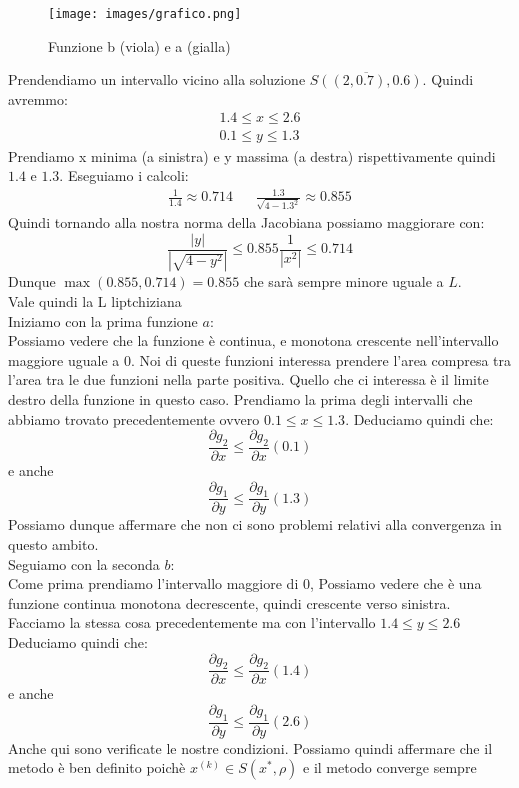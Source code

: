 \documentclass[11pt]{article}
\begin{document}
\begin{figure}[H]
  \centering
  \texttt{[image: images/grafico.png]}
  \caption{Funzione b (viola) e a (gialla)}
  \label{fig:funzione1}
\end{figure} 
Prendendiamo un intervallo vicino alla soluzione $\overline{S((2,0.7), 0.6)}$.
Quindi avremmo:
\[
\begin{matrix}
1.4\leq x\leq2.6\\
0.1 \leq y \leq 1.3	
\end{matrix}
\]
Prendiamo x minima (a sinistra) e y massima (a destra) rispettivamente quindi $1.4$ e $1.3$. Eseguiamo i calcoli:
\[
\begin{matrix}
	\frac{1}{1.4}\approx0.714&&
	\frac{1.3}{\sqrt{4-1.3^2}}\approx0.855
\end{matrix}
\]
Quindi tornando alla nostra norma della Jacobiana possiamo maggiorare con:
\[
 \frac{|y|}{|\sqrt{4-y^2}|}\leq0.855  \frac{1}{|x^2|}\leq0.714 
\]
Dunque $\max{(0.855,0.714)}=0.855$ che sarà sempre minore uguale a $L$.\\
Vale quindi la L liptchiziana\\
Iniziamo con la prima funzione $a$:\\
Possiamo vedere che la funzione è continua, e monotona crescente nell'intervallo maggiore uguale a 0. Noi di queste funzioni interessa prendere l'area compresa tra l'area  tra le due funzioni nella parte positiva. Quello che ci interessa è il limite destro della funzione in questo caso. Prendiamo la prima degli intervalli che abbiamo trovato precedentemente ovvero $0.1\leq x\leq 1.3$.
Deduciamo quindi che:\\
\[
	\frac{\partial g_2}{\partial x}\leq \frac{\partial g_2}{\partial x}(0.1)
\] e anche
\[
	\frac{\partial g_1}{\partial y}\leq \frac{\partial g_1}{\partial y}(1.3)
\]
Possiamo dunque affermare che non ci sono problemi relativi alla convergenza in questo ambito.
\\Seguiamo con la seconda $b$:\\
Come prima prendiamo l'intervallo maggiore di 0, Possiamo vedere che è una funzione continua monotona decrescente, quindi crescente verso sinistra.\\
Facciamo la stessa cosa precedentemente ma con l'intervallo $1.4\leq y\leq2.6$
Deduciamo quindi che:\\
\[
	\frac{\partial g_2}{\partial x}\leq \frac{\partial g_2}{\partial x}(1.4)
\] e anche
\[
	\frac{\partial g_1}{\partial y}\leq \frac{\partial g_1}{\partial y}(2.6)
\]
Anche qui sono verificate le nostre condizioni. Possiamo quindi affermare che il metodo è ben definito poichè $x^{(k)} \in S(x^*,\rho)$ e il metodo converge sempre
\end{document}
